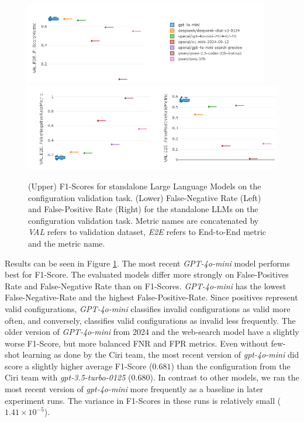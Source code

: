 \begin{figure}[!ht]
    \centering
    \includegraphics[width=0.95\textwidth]{images/LLMStandalone-by-model.png}\\[6pt]
    \includegraphics[width=\textwidth]{images/LLMStandalone-by-model-FNRFPR.png}
    \caption{(Upper) F1-Scores for standalone Large Language Models on the configuration validation task. (Lower) False-Negative Rate (Left) and False-Positive Rate (Right) for the standalone LLMs on the configuration validation task. Metric names are concatenated by \textit{VAL} refers to validation dataset, \textit{E2E} refers to End-to-End metric and the metric name.}
    \label{fig:LLMStandalone-Results}
  \end{figure}

Results can be seen in Figure \ref{fig:LLMStandalone-Results}. The most recent \textit{GPT-4o-mini} model performs best for F1-Score. The evaluated models differ more strongly on False-Positives Rate and False-Negative Rate than on F1-Scores. \textit{GPT-4o-mini} has the lowest False-Negative-Rate and the highest False-Positive-Rate. Since positives represent valid configurations, \textit{GPT-4o-mini} classifies invalid configurations as valid more often, and conversely, classifies valid configurations as invalid less frequently. The older version of \textit{GPT-4o-mini} from 2024 and the web-search model have a slightly worse F1-Score, but more balanced FNR and FPR metrics. Even without few-shot learning as done by the Ciri team, the most recent version of \textit{gpt-4o-mini} did score a slightly higher average F1-Score ($0.681$) than the configuration from the Ciri team with \textit{gpt-3.5-turbo-0125} ($0.680$). In contrast to other models, we ran the most recent version of \textit{gpt-4o-mini} more frequently as a baseline in later experiment runs. The variance in F1-Scores in these runs is relatively small ($1.41 \times 10^{-5}$).


